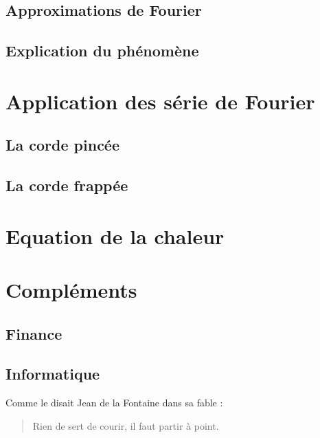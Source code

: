 \documentclass[a4paper,12pt]{report}
\begin{document}
\section{Approximations de Fourier}

\section{Explication du ph\'enom\`ene}

\chapter{Application des série de Fourier}
\section{La corde pincée}
\section{La corde frappée}

\chapter{Equation de la chaleur}

\chapter{Compléments}
\section{Finance}
\section{Informatique}

Comme le disait Jean de la Fontaine dans sa fable :
\begin{quote}
Rien de sert de courir, il faut partir à point.
\end{quote}
\end{document}
